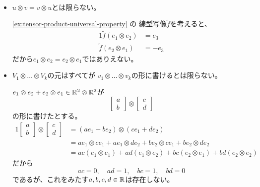 \documentclass[report]{jlreq}
\begin{document}
\begin{remark}[テンソル積の諸性質]
    ~
    \begin{itemize}
        \item $u \otimes v = v \otimes u$とは限らない。
            \begin{innerproof}
                \cref{ex:tensor-product-universal-property} の
                線型写像$\tilde{f}$を考えると、
                \begin{alignat}{1}
                    \tilde{f}(e_1 \otimes e_2) &= e_3 \\
                    \tilde{f}(e_2 \otimes e_1) &= - e_3
                \end{alignat}
                だから$e_1 \otimes e_2 = e_2 \otimes e_1$ではありえない。
            \end{innerproof}
        \item $V_1 \otimes \dots \otimes V_k$の元はすべてが
            $v_1 \otimes \dots \otimes v_k$の形に書けるとは限らない。
            \begin{innerproof}
                $e_1 \otimes e_2 + e_2 \otimes e_1 \in \mathbb{R}^2 \otimes \mathbb{R}^2$が
                \begin{equation}
                    \begin{bmatrix}
                        a \\ b
                    \end{bmatrix} \otimes \begin{bmatrix}
                        c \\ d
                    \end{bmatrix}
                \end{equation}
                の形に書けたとする。
                \begin{alignat}{1}
                    \begin{bmatrix}
                        a \\ b
                    \end{bmatrix} \otimes \begin{bmatrix}
                        c \\ d
                    \end{bmatrix}
                        &= (ae_1 + be_2) \otimes (ce_1 + de_2) \\
                        &= ae_1 \otimes ce_1 + ae_1 \otimes de_2 + be_2 \otimes ce_1 + be_2 \otimes de_2 \\
                        &= ac (e_1 \otimes e_1) + ad (e_1 \otimes e_2) + bc (e_2 \otimes e_1) + bd (e_2 \otimes e_2)
                \end{alignat}
                だから
                \begin{equation}
                    ac = 0, \quad ad = 1, \quad bc = 1, \quad bd = 0
                \end{equation}
                であるが、これをみたす$a, b, c, d \in \mathbb{R}$は存在しない。
            \end{innerproof}
    \end{itemize}
\end{remark}
\end{document}
